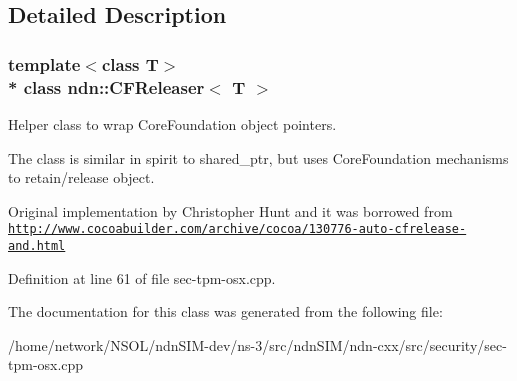 \subsection{Detailed Description}
\subsubsection*{template$<$class T$>$\\*
class ndn\+::\+C\+F\+Releaser$<$ T $>$}

Helper class to wrap Core\+Foundation object pointers. 

The class is similar in spirit to shared\+\_\+ptr, but uses Core\+Foundation mechanisms to retain/release object.

Original implementation by Christopher Hunt and it was borrowed from \href{http://www.cocoabuilder.com/archive/cocoa/130776-auto-cfrelease-and.html}{\tt http\+://www.\+cocoabuilder.\+com/archive/cocoa/130776-\/auto-\/cfrelease-\/and.\+html} 

Definition at line 61 of file sec-\/tpm-\/osx.\+cpp.



The documentation for this class was generated from the following file\+:\begin{DoxyCompactItemize}
\item 
/home/network/\+N\+S\+O\+L/ndn\+S\+I\+M-\/dev/ns-\/3/src/ndn\+S\+I\+M/ndn-\/cxx/src/security/sec-\/tpm-\/osx.\+cpp\end{DoxyCompactItemize}

